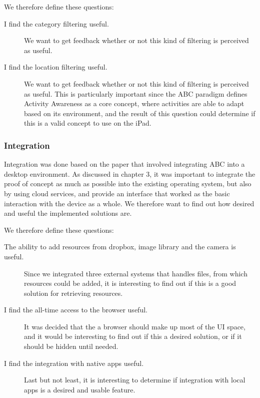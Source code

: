 We therefore define these questions:

\begin{description}
  \item[I find the category filtering useful.] We want to get feedback whether or not this kind of filtering is perceived as useful. 
  
  \item[I find the location filtering useful.] We want to get feedback whether or not this kind of filtering is perceived as useful. This is particularly important since the ABC paradigm defines Activity Awareness as a core concept, where activities are able to adapt based on its environment, and the result of this question could determine if this is a valid concept to use on the iPad.
\end{description}

\subsubsection{Integration}
Integration was done based on the paper that involved integrating ABC into a desktop environment. As discussed in chapter 3, it was important to integrate the proof of concept as much as possible into the existing operating system, but also by using cloud services, and provide an interface that worked as the basic interaction with the device as a whole. We therefore want to find out how desired and useful the implemented solutions are.

We therefore define these questions:

\begin{description}

  \item[The ability to add resources from dropbox, image library and the camera is useful.] Since we integrated three external systems that handles files, from which resources could be added, it is interesting to find out if this is a good solution for retrieving resources.
  
  \item[I find the all-time access to the browser useful.] It was decided that the a browser should make up most of the UI space, and it would be interesting to find out if this a desired solution, or if it should be hidden until needed.
  
  \item[I find the integration with native apps useful.] Last but not least, it is interesting to determine if integration with local apps is a desired and usable feature.
  
\end{description}


